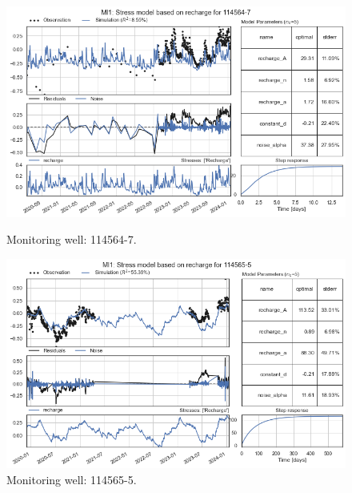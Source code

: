 \begin{figure}[htbp]
    \centering
    \begin{minipage}{0.32\textwidth}
        \centering
        \includegraphics[width=\linewidth]{frontmatter/Rozenburg-fig/28.png}
        \caption{Monitoring well: 114564-7.}
        \label{fig:112565-3}
    \end{minipage}
    \hfill
    \begin{minipage}{0.32\textwidth}
        \centering
        \includegraphics[width=\linewidth]{frontmatter/Rozenburg-fig/29.png}
        \caption{Monitoring well: 114565-5.}
        \label{fig:112565-3}
    \end{minipage}
    \hfill
\end{figure}\\

\newpage

